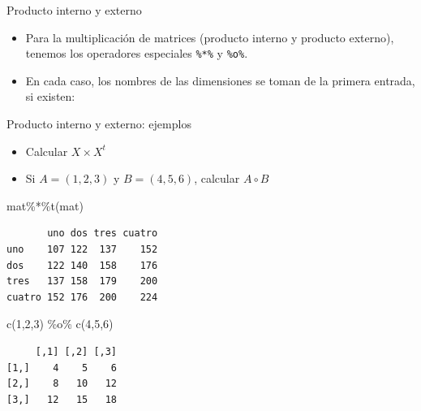 \documentclass[
  ignorenonframetext,
  aspectratio=169,
  spanish,
]{beamer}
\newenvironment{Shaded}{\begin{snugshade}}{\end{snugshade}}
\newcommand{\DecValTok}[1]{\textcolor[rgb]{0.68,0.00,0.00}{#1}}
\newcommand{\FunctionTok}[1]{\textcolor[rgb]{0.28,0.35,0.67}{#1}}
\newcommand{\NormalTok}[1]{\textcolor[rgb]{0.00,0.23,0.31}{#1}}
\newcommand{\SpecialCharTok}[1]{\textcolor[rgb]{0.37,0.37,0.37}{#1}}
\providecommand{\tightlist}{%
  \setlength{\itemsep}{0pt}\setlength{\parskip}{0pt}}
\begin{document}
\begin{frame}[fragile]{Producto interno y externo}
\label{producto-interno-y-externo}
\begin{itemize}
\item
  Para la multiplicación de matrices (producto interno y producto
  externo), tenemos los operadores especiales \texttt{\%*\%} y
  \texttt{\%o\%}.
\item
  En cada caso, los nombres de las dimensiones se toman de la primera
  entrada, si existen:
\end{itemize}
\end{frame}

\begin{frame}[fragile]{Producto interno y externo: ejemplos}
\label{producto-interno-y-externo-ejemplos}
\begin{itemize}
\tightlist
\item
  Calcular \(X\times X^t\)
\item
  Si \(A=(1,2,3)\) y \(B=(4,5,6)\), calcular \(A \circ B\)
\end{itemize}

\begin{Shaded}
\begin{Highlighting}[]
\NormalTok{mat}\SpecialCharTok{\%*\%}\FunctionTok{t}\NormalTok{(mat)}
\end{Highlighting}
\end{Shaded}

\begin{verbatim}
       uno dos tres cuatro
uno    107 122  137    152
dos    122 140  158    176
tres   137 158  179    200
cuatro 152 176  200    224
\end{verbatim}

\begin{Shaded}
\begin{Highlighting}[]
\FunctionTok{c}\NormalTok{(}\DecValTok{1}\NormalTok{,}\DecValTok{2}\NormalTok{,}\DecValTok{3}\NormalTok{) }\SpecialCharTok{\%o\%} \FunctionTok{c}\NormalTok{(}\DecValTok{4}\NormalTok{,}\DecValTok{5}\NormalTok{,}\DecValTok{6}\NormalTok{)}
\end{Highlighting}
\end{Shaded}

\begin{verbatim}
     [,1] [,2] [,3]
[1,]    4    5    6
[2,]    8   10   12
[3,]   12   15   18
\end{verbatim}
\end{frame}
\end{document}
